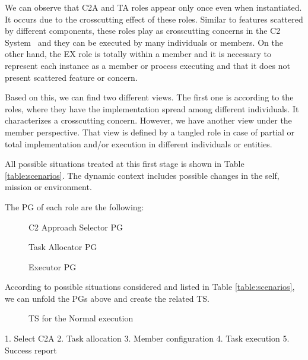 We can observe that C2A and TA roles appear only once even when instantiated. It occurs due to the crosscutting effect of these roles. Similar to features scattered by different components, these roles play as crosscutting concerns in the C2 System~\cite{Apel2013} and they can be executed by many individuals or members. On the other hand, the EX role is totally within a member and it is necessary to represent each instance as a member or process executing and that it does not present scattered feature or concern.

Based on this, we can find two different views. The first one is according to the roles, where they have the implementation spread among different individuals. It characterizes a crosscutting concern. However, we have another view under the member perspective. That view is defined by a tangled role in case of partial or total implementation and/or execution in different individuals or entities. 

All possible situations treated at this first stage is shown in Table \ref{table:scenarios}. The dynamic context includes possible changes in the self, mission or environment.



The PG of each role are the following:

\begin{figure}[h]
\centering
\label{PG001}
\scalebox{.8}{}
\caption{C2 Approach Selector PG}
\end{figure}


\begin{figure}[h]
\centering
\label{PG002}
\scalebox{.8}{}
\caption{Task Allocator PG}
\end{figure}


\begin{figure}[h]
\centering
\label{PG003}
\scalebox{.8}{}
\caption{Executor PG}
\end{figure}

According to possible situations considered and listed in Table \ref{table:scenarios}, we can unfold the PGs above and create the related TS.

\begin{figure}[h!]
\centering
\label{TS01}
\scalebox{.8}{}
\caption{TS for the Normal execution}
\end{figure}





1. Select C2A
2. Task allocation
3. Member configuration
4. Task execution
5. Success report